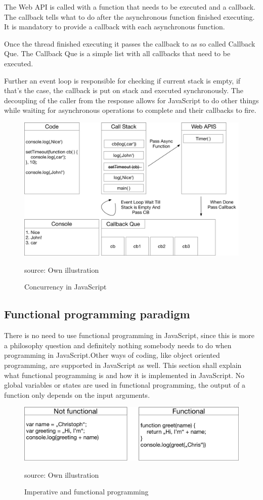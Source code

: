 The Web API is called with a function that needs to be executed and a callback.
The callback tells what to do after the asynchronous function finished executing. It is mandatory to provide a callback with each asynchronous function.

Once the thread finished executing it passes the callback to as so called Callback Que. The Callback Que is a simple list with all callbacks that need to be executed. 

Further an event loop is responsible for checking if current stack is empty, if that's the case, the callback is put on stack and executed synchronously. The decoupling of the caller from the response allows for JavaScript to do other things while waiting for asynchronous operations to complete and their callbacks to fire. 

\begin{figure}[H]
	\centering
	\includegraphics[width=0.8\linewidth]{bilder/grundlagen/Concurrency.png}
	\caption{Concurrency in JavaScript} source: Own illustration
	\label{fig:CC}
\end{figure}

\subsection{Functional programming paradigm}
There is no need to use functional programming in JavaScript, since this is more a philosophy question and definitely nothing somebody needs to do when programming in JavaScript.Other ways of coding, like object oriented programming, are supported in JavaScript as well. This section shall explain what functional programming is and how it is implemented in JavaScript. No global variables or states are used in functional programming, the output of a function only depends on the input arguments. \cite{Steyer2014JavaScript}

\begin{figure}[H]
	\centering
	\includegraphics[width=0.8\linewidth]{bilder/grundlagen/fp.png}
	\caption{Imperative and functional programming} source: Own illustration
	\label{fig:FP}
\end{figure}

